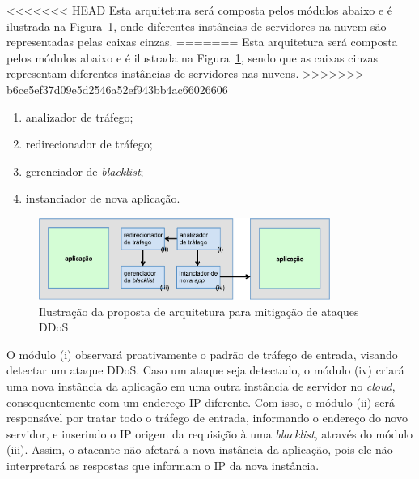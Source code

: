 \documentclass[a4paper, 11pt]{article}
\begin{document}
<<<<<<< HEAD
Esta arquitetura será composta pelos módulos abaixo e é ilustrada na
Figura~\ref{fig:arq}, onde diferentes inst\^ancias de servidores na nuvem s\~ao
representadas pelas caixas cinzas.
=======
Esta arquitetura será composta pelos módulos abaixo e é ilustrada na Figura~\ref{fig:arq}, sendo que as caixas cinzas representam diferentes instâncias de servidores nas nuvens.
>>>>>>> b6ce5ef37d09e5d2546a52ef943bb4ac66026606

\begin{enumerate}[i]
  \item analizador de tráfego;
  \item redirecionador de tráfego;
  \item gerenciador de \emph{blacklist};
  \item instanciador de nova aplica\c{c}\~{a}o.
\end{enumerate}

\begin{figure}[h!]
\centering
\includegraphics[width=0.85\textwidth]{arquitetura.eps}
\caption{Ilustração da proposta de arquitetura para mitigação de ataques DDoS}
\label{fig:arq}
\end{figure}


O módulo (i) observará proativamente o padrão de tráfego de entrada, visando
detectar um ataque DDoS. Caso um ataque seja detectado, o m\'odulo (iv) criará
uma nova
instância da aplicação em uma outra instância de servidor no \emph{cloud},
consequentemente com um endereço IP diferente.
Com isso, o módulo (ii) será responsável por tratar todo o tráfego de
entrada, informando o endereço do novo servidor, e inserindo o IP origem da
requisição à uma \emph{blacklist}, através do módulo (iii). Assim, o
atacante não afetará a nova instância da aplicação, pois ele não interpretará as
respostas que informam o IP da nova instância.
\end{document}
